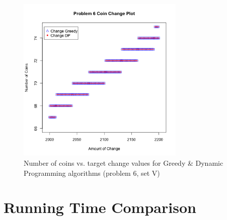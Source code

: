 \documentclass[11pt]{scrreprt}
\begin{document}
\begin{figure}[!htbp]
\centering
\includegraphics[width=8cm]{situation3.png}
\caption{Number of coins vs. target change values for Greedy \& Dynamic Programming algorithms (problem 6, set V)}
\label{fig:p6}
\end{figure}


\section{Running Time Comparison}
\end{document}

